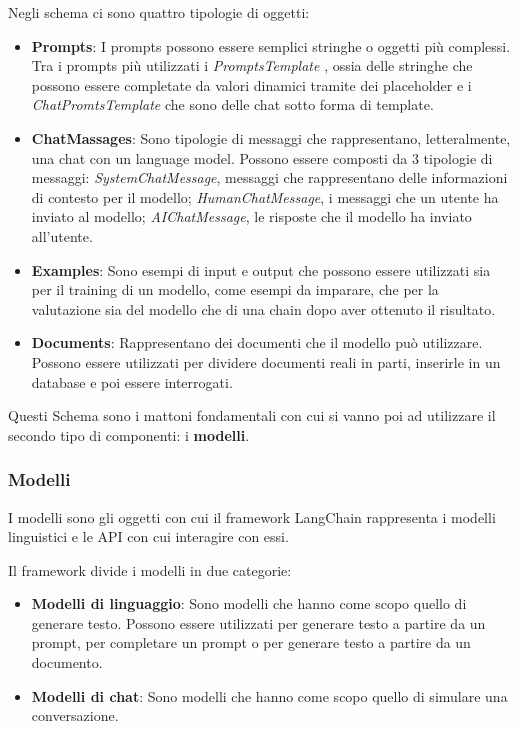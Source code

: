 Negli schema ci sono quattro tipologie di oggetti:
\begin{itemize}
    \item \textbf{Prompts}: I prompts possono essere semplici stringhe o oggetti più complessi. Tra i prompts più utilizzati i \textit{PromptsTemplate} \label{PromptsTemplate}, ossia delle stringhe che possono essere completate da valori dinamici tramite dei placeholder e i \textit{ChatPromtsTemplate} che sono delle chat sotto forma di template. 
    \item \textbf{ChatMassages}: Sono tipologie di messaggi che rappresentano, letteralmente, una chat con un language model. Possono essere composti da 3 tipologie di messaggi: \textit{SystemChatMessage}, messaggi che rappresentano delle informazioni di contesto per il modello; \textit{HumanChatMessage}, i messaggi che un utente ha inviato al modello; \textit{AIChatMessage}, le risposte che il modello ha inviato all'utente.
    \item \textbf{Examples}: Sono esempi di input e output che possono essere utilizzati sia per il training di un modello, come esempi da imparare, che per la valutazione sia del modello che di una chain dopo aver ottenuto il risultato.
    \item \textbf{Documents}: Rappresentano dei documenti che il modello può utilizzare. Possono essere utilizzati per dividere documenti reali in parti, inserirle in un database e poi essere interrogati.
\end{itemize}

Questi Schema sono i mattoni fondamentali con cui si vanno poi ad utilizzare il secondo tipo di componenti: i \textbf{modelli}.

\subsubsection*{Modelli}
I modelli sono gli oggetti con cui il framework LangChain rappresenta i modelli linguistici e le API con cui interagire con essi.

Il framework divide i modelli in due categorie:
\begin{itemize}
    \item \textbf{Modelli di linguaggio}: Sono modelli che hanno come scopo quello di generare testo. Possono essere utilizzati per generare testo a partire da un prompt, per completare un prompt o per generare testo a partire da un documento.
    \item \textbf{Modelli di chat}: Sono modelli che hanno come scopo quello di simulare una conversazione. 
\end{itemize}

